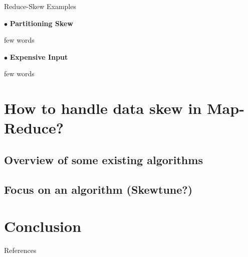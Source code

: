\documentclass[11pt]{beamer}
\begin{document}

\begin{frame}{Reduce-Skew Examples \cite{Kwon11astudy}}

$\bullet$ \textbf{Partitioning Skew}

few words

\vfill

$\bullet$ \textbf{Expensive Input}

few words

\end{frame}


\section{How to handle data skew in Map-Reduce?}


\subsection{Overview of some existing algorithms}


\subsection{Focus on an algorithm (Skewtune?)}


\begin{frame}
\end{frame}


\section{Conclusion}


\begin{frame}
    \cite{Kwon11astudy}
    \cite{Kwon:2012:SMS:2213836.2213840}
    \cite{gufler2011handling}
    \cite{ibrahim:hal-00822973}
\end{frame}


\begin{frame}[allowframebreaks]{References}
    \printbibliography
\end{frame}

\end{document}
